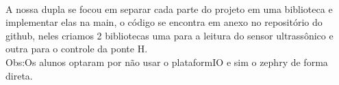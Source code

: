 \paragraph{}A nossa dupla se focou em separar cada parte do projeto em uma biblioteca e
implementar elas na main, o código se encontra em anexo no repositório do github, neles
criamos 2 bibliotecas uma para a leitura do sensor ultrassônico e outra para o controle da
ponte H.\\

Obs:Os alunos optaram por não usar o plataformIO e sim o zephry de forma direta.